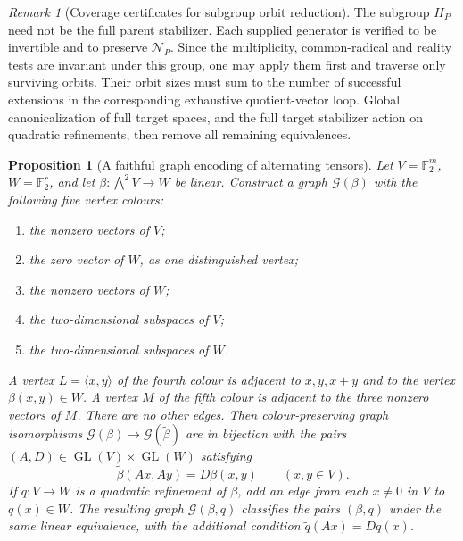 \documentclass[11pt,a4paper]{amsart}
\newtheorem{prop}[thm]{Proposition}
\theoremstyle{definition}
\theoremstyle{remark}
\newtheorem{remark}[thm]{Remark}
\DeclareMathOperator{\GL}{GL}
\numberwithin{equation}{section}
\begin{document}
\begin{remark}[Coverage certificates for subgroup orbit reduction]
The subgroup $H_P$ need not be the full parent stabilizer. Each
supplied generator is verified to be invertible and to preserve
$\mathcal N_P$. Since the multiplicity, common-radical and reality
tests are invariant under this group, one may apply them first and
traverse only surviving orbits. Their orbit sizes must sum to the
number of successful extensions in the corresponding exhaustive
quotient-vector loop. Global canonicalization of full target spaces,
and the full target stabilizer action on quadratic refinements,
then remove all remaining equivalences.
\end{remark}

\begin{prop}[A faithful graph encoding of alternating tensors]
\label{prop:polar-graph}
Let $V=\mathbb F_2^m$, $W=\mathbb F_2^r$, and let
$\beta:\bigwedge^2V\to W$ be linear. Construct a graph
$\mathcal G(\beta)$ with the following five vertex colours:
\begin{enumerate}
\item the nonzero vectors of $V$;
\item the zero vector of $W$, as one distinguished vertex;
\item the nonzero vectors of $W$;
\item the two-dimensional subspaces of $V$;
\item the two-dimensional subspaces of $W$.
\end{enumerate}
A vertex $L=\langle x,y\rangle$ of the fourth colour is adjacent
to $x,y,x+y$ and to the vertex $\beta(x,y)\in W$.
A vertex $M$ of the fifth colour is adjacent to the three nonzero
vectors of $M$. There are no other edges.
Then colour-preserving graph isomorphisms
$\mathcal G(\beta)\to\mathcal G(\widetilde\beta)$ are in bijection
with the pairs $(A,D)\in\GL(V)\times\GL(W)$ satisfying
\[
 \widetilde\beta(Ax,Ay)=D\beta(x,y)
 \qquad(x,y\in V).
\]
If $q:V\to W$ is a quadratic refinement of $\beta$, add an edge
from each $x\ne0$ in $V$ to $q(x)\in W$. The resulting graph
$\mathcal G(\beta,q)$ classifies the pairs $(\beta,q)$ under the same
linear equivalence, with the additional condition
$\widetilde q(Ax)=Dq(x)$.
\end{prop}
\end{document}
